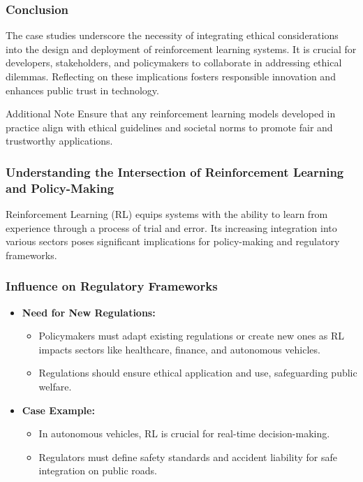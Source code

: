 \documentclass[aspectratio=169]{beamer}
\begin{document}
\begin{frame}[fragile]
    \frametitle{Conclusion}
    The case studies underscore the necessity of integrating ethical considerations into the design and deployment of reinforcement learning systems. 
    It is crucial for developers, stakeholders, and policymakers to collaborate in addressing ethical dilemmas. 
    Reflecting on these implications fosters responsible innovation and enhances public trust in technology.
    
    \begin{block}{Additional Note}
        Ensure that any reinforcement learning models developed in practice align with ethical guidelines and societal norms to promote fair and trustworthy applications.
    \end{block}
\end{frame}

\begin{frame}[fragile]
    \frametitle{Understanding the Intersection of Reinforcement Learning and Policy-Making}
    Reinforcement Learning (RL) equips systems with the ability to learn from experience through a process of trial and error. Its increasing integration into various sectors poses significant implications for policy-making and regulatory frameworks. 
\end{frame}

\begin{frame}[fragile]
    \frametitle{Influence on Regulatory Frameworks}
    \begin{itemize}
        \item \textbf{Need for New Regulations:}
        \begin{itemize}
            \item Policymakers must adapt existing regulations or create new ones as RL impacts sectors like healthcare, finance, and autonomous vehicles.
            \item Regulations should ensure ethical application and use, safeguarding public welfare.
        \end{itemize}
        \item \textbf{Case Example:}
        \begin{itemize}
            \item In autonomous vehicles, RL is crucial for real-time decision-making.
            \item Regulators must define safety standards and accident liability for safe integration on public roads.
        \end{itemize}
    \end{itemize}
\end{frame}
\end{document}
